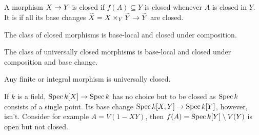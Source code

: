 \documentclass[a4paper,parskip=half,numbers=enddot, DIV=12]{scrreprt}
\begin{document}
\begin{defi}
    A morphism $X\morphism Y$ is closed if $f(A)\subseteq Y$ is closed whenever $A$ is closed in $Y$. It is  if all its base changes $\snake X = X\times_Y \snake Y \morphism \snake Y$ are closed.
\end{defi}
\begin{rem}
    \begin{alphanumerate}
    \item {}
        The class of closed morphisms is base-local and closed under composition.
    \item  
        The class of universally closed morphisms is base-local and closed under composition and base change.
    \item 
        Any finite or integral morphism is universally closed.
    \end{alphanumerate}
\end{rem}
\begin{example}
	If $k$ is a field, $\Spec k[X]\morphism\Spec k$ has no choice but to be closed as $\operatorname{Spec} k$ consists of a single point. Its base change $\Spec k[X,Y]\morphism\Spec k[Y]$, however, isn't. Consider for example $A=V(1-XY)$, then $f(A)=\operatorname{Spec} k[Y]\setminus V(Y)$ is open but not closed.
\end{example}
\end{document}
